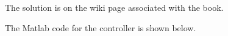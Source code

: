 
The solution is on the wiki page associated with the book.

The Matlab code for the controller is shown below.

%

\ifsolutionmanual




\else





\fi
